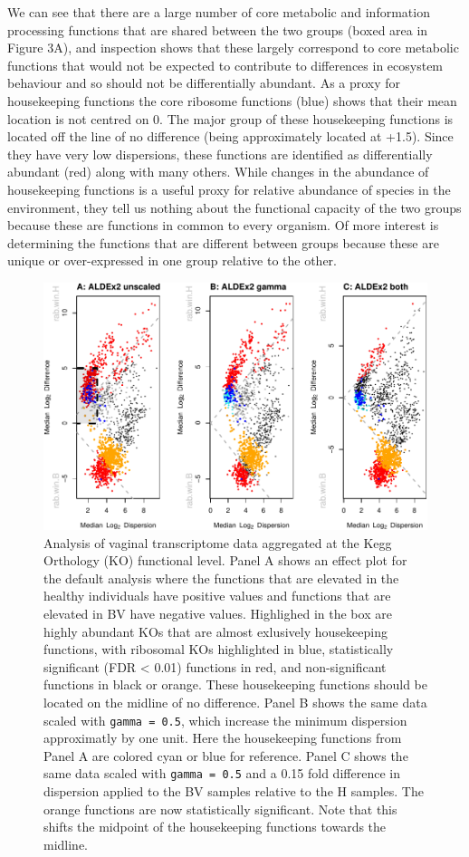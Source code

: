 \documentclass[
]{article}
\begin{document}
We can see that there are a large number of core metabolic and
information processing functions that are shared between the two groups
(boxed area in Figure 3A), and inspection shows that these largely
correspond to core metabolic functions that would not be expected to
contribute to differences in ecosystem behaviour and so should not be
differentially abundant. As a proxy for housekeeping functions the core
ribosome functions (blue) shows that their mean location is not centred
on 0. The major group of these housekeeping functions is located off the
line of no difference (being approximately located at +1.5). Since they
have very low dispersions, these functions are identified as
differentially abundant (red) along with many others. While changes in
the abundance of housekeeping functions is a useful proxy for relative
abundance of species in the environment, they tell us nothing about the
functional capacity of the two groups because these are functions in
common to every organism. Of more interest is determining the functions
that are different between groups because these are unique or
over-expressed in one group relative to the other.

\begin{figure}
\centering
\includegraphics{go3_files/figure-latex/meta-1.pdf}
\caption{Analysis of vaginal transcriptome data aggregated at the Kegg
Orthology (KO) functional level. Panel A shows an effect plot for the
default analysis where the functions that are elevated in the healthy
individuals have positive values and functions that are elevated in BV
have negative values. Highlighed in the box are highly abundant KOs that
are almost exlusively housekeeping functions, with ribosomal KOs
highlighted in blue, statistically significant (FDR \textless{} 0.01)
functions in red, and non-significant functions in black or orange.
These housekeeping functions should be located on the midline of no
difference. Panel B shows the same data scaled with
\texttt{gamma\ =\ 0.5}, which increase the minimum dispersion
approximatly by one unit. Here the housekeeping functions from Panel A
are colored cyan or blue for reference. Panel C shows the same data
scaled with \texttt{gamma\ =\ 0.5} and a 0.15 fold difference in
dispersion applied to the BV samples relative to the H samples. The
orange functions are now statistically significant. Note that this
shifts the midpoint of the housekeeping functions towards the midline.}
\end{figure}
\end{document}
